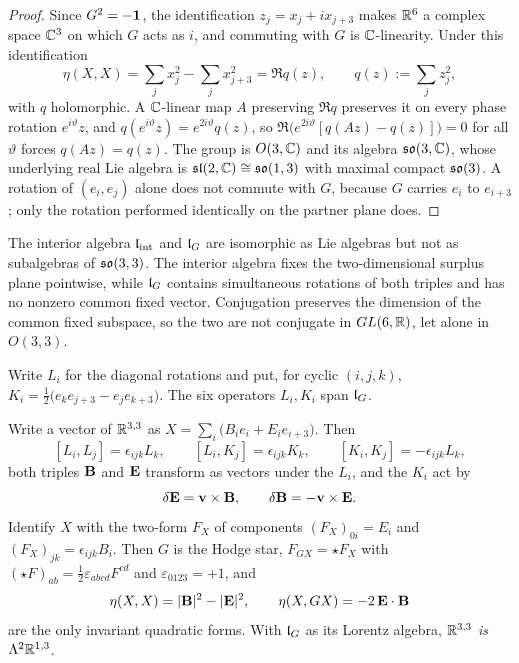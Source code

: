 \begin{proof}
Since $G^2=-\mathbf 1$, the identification $z_j=x_j+ix_{j+3}$ makes $\mathbb{R}^6$ a complex space $\mathbb{C}^3$ on which $G$ acts as $i$, and
commuting with $G$ is $\mathbb{C}$-linearity. Under this identification
\[
\eta(X,X)=\sum_jx_j^2-\sum_jx_{j+3}^2=\Re q(z),\qquad q(z):=\sum_jz_j^2,
\]
with $q$ holomorphic. A $\mathbb{C}$-linear map $A$ preserving $\Re q$ preserves it on every phase rotation $e^{i\vartheta}z$, and
$q(e^{i\vartheta}z)=e^{2i\vartheta}q(z)$, so $\Re\bigl(e^{2i\vartheta}[q(Az)-q(z)]\bigr)=0$ for all $\vartheta$ forces $q(Az)=q(z)$. The
group is $O(3,\mathbb{C})$ and its algebra $\mathfrak{so}(3,\mathbb{C})$, whose underlying real Lie algebra is $\mathfrak{sl}(2,\mathbb{C})\cong\mathfrak{so}(1,3)$ with maximal compact
$\mathfrak{so}(3)$. A rotation of $(e_i,e_j)$ alone does not commute with $G$, because $G$ carries $e_i$ to $e_{i+3}$; only the rotation
performed identically on the partner plane does.
\end{proof}

\begin{proposition}
\label{prop:notconj}
The interior algebra $\mathfrak l_{\rm int}$ and $\mathfrak l_G$ are isomorphic as Lie algebras but not as subalgebras of $\mathfrak{so}(3,3)$. The interior algebra
fixes the two-dimensional surplus plane pointwise, while $\mathfrak l_G$ contains simultaneous rotations of both triples and has no nonzero
common fixed vector. Conjugation preserves the dimension of the common fixed subspace, so the two are not conjugate in $GL(6,\mathbb{R})$,
let alone in $O(3,3)$.
\end{proposition}

Write $L_i$ for the diagonal rotations and put, for cyclic $(i,j,k)$, $K_i=\tfrac12\bigl(e_ke_{j+3}-e_je_{k+3}\bigr)$. The six
operators $L_i,K_i$ span $\mathfrak l_G$.

\begin{theorem}
\label{thm:emfield}
Write a vector of $\mathbb{R}^{3,3}$ as $X=\sum_i\bigl(B_ie_i+E_ie_{i+3}\bigr)$. Then
\[
[L_i,L_j]=\epsilon_{ijk}L_k,\qquad [L_i,K_j]=\epsilon_{ijk}K_k,\qquad [K_i,K_j]=-\epsilon_{ijk}L_k,
\]
both triples $\mathbf B$ and $\mathbf E$ transform as vectors under the $L_i$, and the $K_i$ act by
\begin{equation}
\label{eq:emboost}
\delta\mathbf E=\mathbf v\times\mathbf B,\qquad \delta\mathbf B=-\mathbf v\times\mathbf E .
\end{equation}
Identify $X$ with the two-form $F_X$ of components $(F_X)_{0i}=E_i$ and $(F_X)_{jk}=\epsilon_{ijk}B_i$. Then $G$ is the Hodge star,
$F_{GX}=\star F_X$ with $(\star F)_{ab}=\tfrac12\varepsilon_{abcd}F^{cd}$ and $\varepsilon_{0123}=+1$, and
\[
\eta(X,X)=|\mathbf B|^2-|\mathbf E|^2,\qquad \eta(X,GX)=-2\,\mathbf E\cdot\mathbf B
\]
are the only invariant quadratic forms. With $\mathfrak l_G$ as its Lorentz algebra, $\mathbb{R}^{3,3}$ \emph{is} $\Lambda^2\mathbb{R}^{1,3}$.
\end{theorem}

